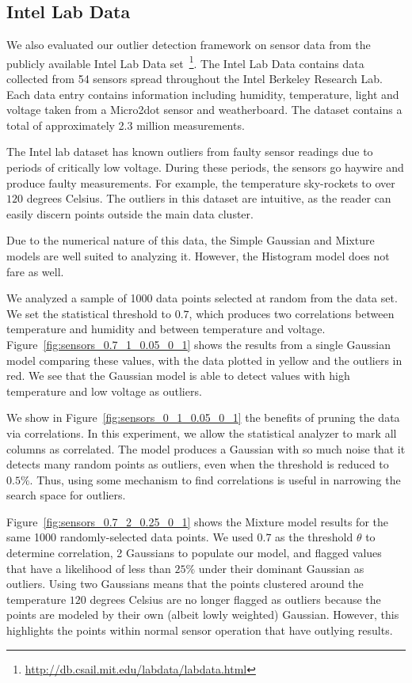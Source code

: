 \subsection{Intel Lab Data}
\label{sec:intel-lab-data-evaluation}

We also evaluated our outlier detection framework on sensor data from the publicly available Intel Lab Data set~\footnote{\url{http://db.csail.mit.edu/labdata/labdata.html}}. The Intel Lab Data contains data collected from 54 sensors spread throughout the Intel Berkeley Research Lab. Each data entry contains information including humidity, temperature, light and voltage taken from a Micro2dot sensor and weatherboard. The dataset contains a total of approximately 2.3 million measurements.

The Intel lab dataset has known outliers from faulty sensor readings due to periods of critically low voltage. During these periods, the sensors go haywire and produce faulty measurements.
For example, the temperature sky-rockets to over $120$ degrees Celsius.
The outliers in this dataset are intuitive, as the reader can easily discern points outside the main data cluster.

Due to the numerical nature of this data, the Simple Gaussian and Mixture models are well suited to analyzing it. However, the Histogram model does not fare as well.

We analyzed a sample of 1000 data points selected at random from the data set. 
We set the statistical threshold to $0.7$, which produces two correlations between temperature and humidity and between temperature and voltage.
Figure~\ref{fig:sensors_0.7_1_0.05_0_1} shows the results from a single Gaussian model comparing these values, with the data plotted in yellow and the outliers in red.
We see that the Gaussian model is able to detect values with high temperature and low voltage as outliers.

We show in Figure~\ref{fig:sensors_0_1_0.05_0_1} the benefits of pruning the data via correlations.
In this experiment, we allow the statistical analyzer to mark all columns as correlated.
The model produces a Gaussian with so much noise that it detects many random points as outliers, even when the threshold is reduced to $0.5\%$. 
Thus, using some mechanism to find correlations is useful in narrowing the search space for outliers.

Figure~\ref{fig:sensors_0.7_2_0.25_0_1} shows the Mixture model results for the same 1000 randomly-selected data points. 
We used $0.7$ as the threshold $\theta$ to determine correlation, 2 Gaussians to populate our model, and flagged values that have a likelihood of less than $25\%$ under their dominant Gaussian as outliers.
Using two Gaussians means that the points clustered around the temperature $120$ degrees Celsius are no longer flagged as outliers because the points are modeled by their own (albeit lowly weighted) Gaussian.
However, this highlights the points within normal sensor operation that have outlying results.

